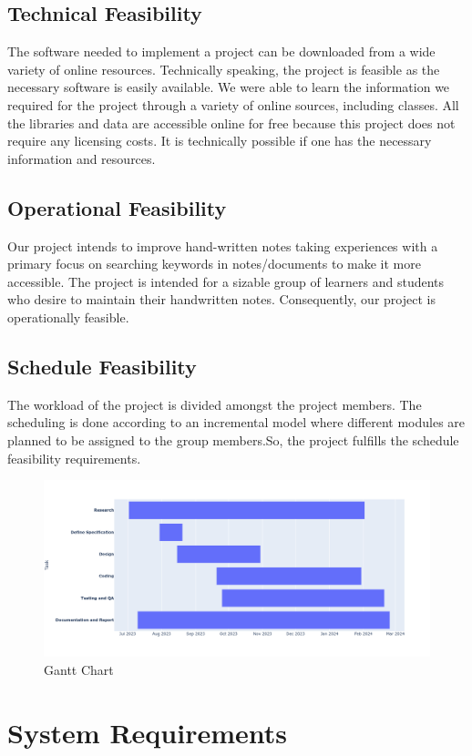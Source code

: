  \subsection{Technical Feasibility}
 The software needed to implement a project can be downloaded from a wide variety of
online resources. Technically speaking, the project is feasible as the necessary software is
easily available. We were able to learn the information we required for the project
through a variety of online sources, including classes. All the libraries and data are
accessible online for free because this project does not require any licensing costs. It is
technically possible if one has the necessary information and resources.
 \subsection{Operational Feasibility}
 Our project intends to improve hand-written notes taking experiences with a primary
focus on searching keywords in notes/documents to make it more accessible. The project
is intended for a sizable group of learners and students who desire to maintain their
handwritten notes. Consequently, our project is operationally feasible.
 \subsection{Schedule Feasibility}
 The workload of the project is divided amongst the project members. The scheduling is
 done according to an incremental model where different modules are planned to be
 assigned to the group members.So, the project fulfills the schedule feasibility
 requirements.
\begin{figure}[h]
    \centering
    \includegraphics[scale=0.35]{images/GanttChart.png}
    \caption{Gantt Chart}\label{fig:my_label}
\end{figure}
\section{System Requirements}

